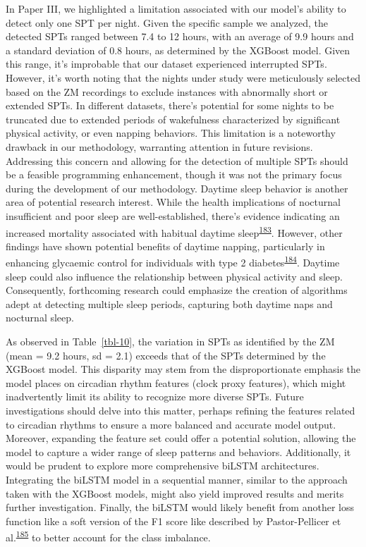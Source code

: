 \documentclass[
  10pt,
]{scrbook}
\begin{document}
In Paper III, we highlighted a limitation associated with our model's
ability to detect only one SPT per night. Given the specific sample we
analyzed, the detected SPTs ranged between 7.4 to 12 hours, with an
average of 9.9 hours and a standard deviation of 0.8 hours, as
determined by the XGBoost model. Given this range, it's improbable that
our dataset experienced interrupted SPTs. However, it's worth noting
that the nights under study were meticulously selected based on the ZM
recordings to exclude instances with abnormally short or extended SPTs.
In different datasets, there's potential for some nights to be truncated
due to extended periods of wakefulness characterized by significant
physical activity, or even napping behaviors. This limitation is a
noteworthy drawback in our methodology, warranting attention in future
revisions. Addressing this concern and allowing for the detection of
multiple SPTs should be a feasible programming enhancement, though it
was not the primary focus during the development of our methodology.
Daytime sleep behavior is another area of potential research interest.
While the health implications of nocturnal insufficient and poor sleep
are well-established, there's evidence indicating an increased mortality
associated with habitual daytime
sleep\textsuperscript{\protect\hyperlink{ref-burazeri_2003}{183}}.
However, other findings have shown potential benefits of daytime
napping, particularly in enhancing glycaemic control for individuals
with type 2
diabetes\textsuperscript{\protect\hyperlink{ref-makino_2018}{184}}.
Daytime sleep could also influence the relationship between physical
activity and sleep. Consequently, forthcoming research could emphasize
the creation of algorithms adept at detecting multiple sleep periods,
capturing both daytime naps and nocturnal sleep.

As observed in Table~\ref{tbl-10}, the variation in SPTs as identified
by the ZM (mean = 9.2 hours, sd = 2.1) exceeds that of the SPTs
determined by the XGBoost model. This disparity may stem from the
disproportionate emphasis the model places on circadian rhythm features
(clock proxy features), which might inadvertently limit its ability to
recognize more diverse SPTs. Future investigations should delve into
this matter, perhaps refining the features related to circadian rhythms
to ensure a more balanced and accurate model output. Moreover, expanding
the feature set could offer a potential solution, allowing the model to
capture a wider range of sleep patterns and behaviors. Additionally, it
would be prudent to explore more comprehensive biLSTM architectures.
Integrating the biLSTM model in a sequential manner, similar to the
approach taken with the XGBoost models, might also yield improved
results and merits further investigation. Finally, the biLSTM would
likely benefit from another loss function like a soft version of the F1
score like described by Pastor-Pellicer et
al.\textsuperscript{\protect\hyperlink{ref-pastor-pellicer_2013}{185}}
to better account for the class imbalance.
\end{document}
